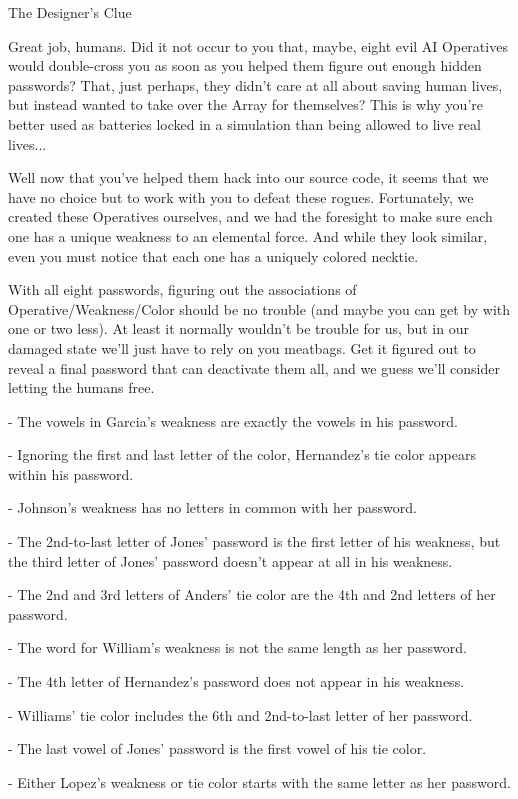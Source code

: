 \documentclass{article}
\begin{document}
\newpage

The Designer's Clue

Great job, humans. Did it not occur to you that, maybe,
eight evil AI Operatives
would double-cross you as soon as you helped them figure out
enough hidden passwords? That, just perhaps, they didn't
care at all about saving human lives, but instead wanted to take
over the Array for themselves? This is why you're better
used as batteries locked in a simulation
than being allowed to live real lives...

Well now that you've helped them hack into our source
code, it seems that we have no choice but to work with you
to defeat these rogues. Fortunately, we created these Operatives
ourselves, and we had the foresight to make sure each one
has a unique weakness to an elemental force. And while they look
similar, even you must notice that each one has a
uniquely colored necktie.

With all eight passwords, figuring out the associations of
Operative/Weakness/Color should be no trouble (and maybe you can
get by with one or two less). At least it normally wouldn't
be trouble for us, but in our damaged state we'll just have to
rely on you meatbags. Get it figured out to reveal a final password
that can deactivate them all, and we guess we'll consider letting the
humans free.

- The vowels in Garcia’s weakness are exactly the vowels in his password.

- Ignoring the first and last letter of the color, Hernandez’s tie color appears within his password.

- Johnson’s weakness has no letters in common with her password.

- The 2nd-to-last letter of Jones’ password is the first letter of his weakness, but the third letter of Jones’ password doesn’t appear at all in his weakness.

- The 2nd and 3rd letters of Anders’ tie color are the 4th and 2nd letters of her password.

- The word for William’s weakness is not the same length as her password.

- The 4th letter of Hernandez’s password does not appear in his weakness.

- Williams’ tie color includes the 6th and 2nd-to-last letter of her password.

- The last vowel of Jones’ password is the first vowel of his tie color.

- Either Lopez’s weakness or tie color starts with the same letter as her password.
\end{document}
